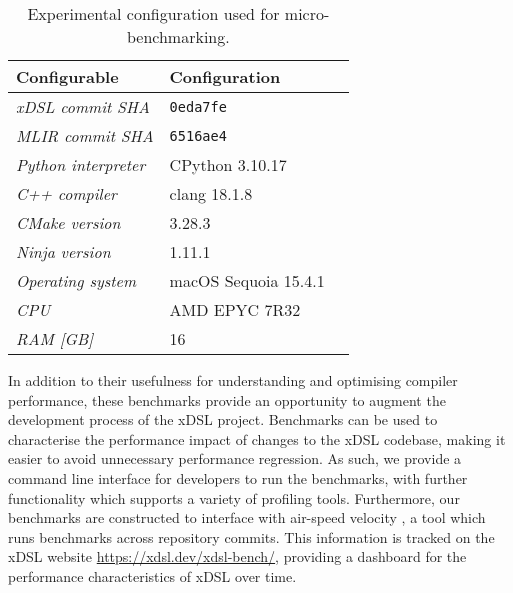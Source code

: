 
\begin{table}[H]
  \caption{Experimental configuration used for micro-benchmarking.}
  \label{tab:ubenchmark-experimental-config}
  \centering
  \begin{tabular}{lll}
    \toprule
    \textbf{Configurable} & \textbf{Configuration} \\
    \midrule
    \textit{xDSL commit SHA} & \texttt{0eda7fe} \\
    \textit{MLIR commit SHA} & \texttt{6516ae4} \\
    \midrule
    \textit{Python interpreter} & CPython 3.10.17 \\
    \textit{C++ compiler} & clang 18.1.8 \\
    \textit{CMake version} & 3.28.3 \\
    \textit{Ninja version} & 1.11.1 \\
    \textit{Operating system} & macOS Sequoia 15.4.1 \\
    \midrule
    \textit{CPU} & AMD EPYC 7R32 \\
    \textit{RAM [GB]} & 16 \\
    \bottomrule
  \end{tabular}
\end{table}

In addition to their usefulness for understanding and optimising compiler performance, these benchmarks provide an opportunity to augment the development process of the xDSL project.
Benchmarks can be used to characterise the performance impact of changes to the xDSL codebase, making it easier to avoid unnecessary performance regression.
As such, we provide a command line interface for developers to run the benchmarks, with further functionality which supports a variety of profiling tools.
Furthermore, our benchmarks are constructed to interface with air-speed velocity \cite{michaeldroettboomAirspeedvelocityAsv2025}, a tool which runs benchmarks across repository commits. This information is tracked on the xDSL website \url{https://xdsl.dev/xdsl-bench/}, providing a dashboard for the performance characteristics of xDSL over time.


